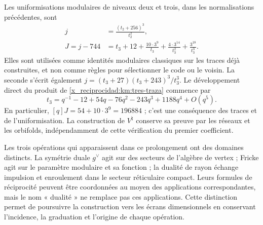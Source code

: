Les uniformisations modulaires de niveaux deux et trois, dans les
normalisations précédentes, sont
\begin{align}
 j&=\frac{(t_2+256)^3}{t_2^2},
 \label{x_reciprocidad:km:j-nivel2}\\
 J=j-744
 &=t_3+12+\frac{10\cdot3^9}{t_3}
       +\frac{4\cdot3^{14}}{t_3^2}
       +\frac{3^{18}}{t_3^3}.
 \label{x_reciprocidad:km:j-nivel3}
\end{align}
Elles sont utilisées comme identités modulaires classiques sur les traces déjà
construites, et non comme règles pour sélectionner le code ou le voisin.
La seconde s'écrit également
\(j=(t_3+27)(t_3+243)^3/t_3^3\).
Le développement direct du produit de \eqref{x_reciprocidad:km:tres-traza} commence par
\[
 t_3=q^{-1}-12+54q-76q^2-243q^3+1188q^4+O(q^5).
\]
En particulier, \([q]J=54+10\cdot3^9=196884\) ; c'est une conséquence des traces et de l'uniformisation. La construction de \(V^\natural\) conserve sa preuve par les réseaux et les orbifolds, indépendamment de cette vérification du premier coefficient.

Les trois opérations qui apparaissent dans ce prolongement ont des domaines distincts. La symétrie duale \(g^\vee\) agit sur des secteurs de l'algèbre de vertex ; Fricke agit sur le paramètre modulaire et sa fonction ; la dualité de rayon échange impulsion et enroulement dans le secteur réticulaire compact. Leurs formules de réciprocité peuvent être coordonnées au moyen des applications correspondantes, mais le nom « dualité » ne remplace pas ces applications. Cette distinction permet de poursuivre la construction vers les écrans dimensionnels en conservant l'incidence, la graduation et l'origine de chaque opération.


